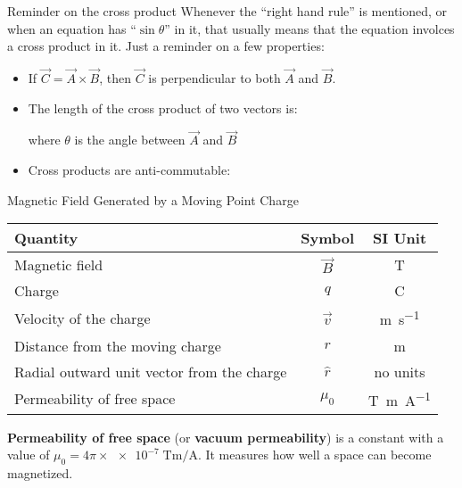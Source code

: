\documentclass[12pt,aspectratio=169]{beamer}
\begin{document}
\begin{frame}{Reminder on the cross product}
  Whenever the ``right hand rule'' is mentioned, or when an equation has
  ``$\sin\theta$'' in it, that usually means that the equation involces a
  cross product in it. Just a reminder on a few properties:
  \begin{itemize}
  \item If $\vec C=\vec A\times\vec B$, then $\vec C$ is perpendicular to both
    $\vec A$ and $\vec B$.
  \item The length of the cross product of two vectors is:
    
    where $\theta$ is the angle between $\vec A$ and $\vec B$
  \item Cross products are anti-commutable:

  \end{itemize}
\end{frame}



\begin{frame}{Magnetic Field Generated by a Moving Point Charge}

  \begin{center}
    \begin{tabular}{l|c|c}
      \rowcolor{pink}
      \textbf{Quantity} & \textbf{Symbol} & \textbf{SI Unit} \\ \hline
      Magnetic field                  & $\vec B$ & \si\tesla \\
      Charge                          & $q$      & \si\coulomb \\
      Velocity of the charge          & $\vec v$ & \si{\meter\per\second}\\
      Distance from the moving charge & $r$      & \si\metre\\
      Radial outward unit vector from the charge & $\hat r$ & no units\\
      Permeability of free space & $\mu_0$ & \si{\tesla\metre\per\ampere}
    \end{tabular}
  \end{center}
  \textbf{Permeability of free space} (or \textbf{vacuum permeability}) is a
  constant with a value of
  $\mu_0=4\pi\times\num{e-7}\;\si{\tesla\metre\per\ampere}$. It measures how
  well a space can become magnetized.
\end{frame}
\end{document}
